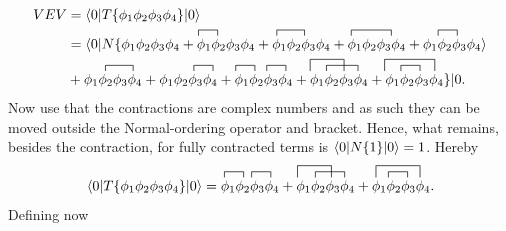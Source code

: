 \begin{example}
\begin{enumerate}
		\begin{equation}
			\begin{split}
				VEV&=\braket{0|T\{\phi_1\phi_2\phi_3\phi_4\}|0}\\
				&
				\contraction{,,,,,,,,,,,,,,,,,,,,}{\phi_1}{.}{\phi_2}
				\contraction{,,,,,,,.,,,,,,,,,,,,,,,,,,,,,,,,,}{\phi_1}{,,}{\phi_2}
				\contraction{,,,,,,,,,,,,,,,,,,,,,,.,,,,,,,,,,,,,,,,,,,,,,}{\phi_1}{,,,,}{\phi_2}
				\contraction{,,,,,,,,,,,,,,,,,,,,,,,,.,,,,,,,,,,,,,,,,,,,,,,,,,,,,,,,,,,}{\phi_1}{.}{\phi_2}
				=\braket{0|N\{\phi_1\phi_2\phi_3\phi_4+\phi_1\phi_2\phi_3\phi_4+\phi_1\phi_2\phi_3\phi_4+\phi_1\phi_2\phi_3\phi_4+\phi_1\phi_2\phi_3\phi_4}\\
					&{
					\contraction{,,,,,}{\phi_1}{,,}{\phi_2}
					\contraction{,,,,,,,,,,,.,.,,,,,,}{\phi_1}{.}{\phi_2}
					\contraction{,,,,,,,,,,,,,,,,,,,,,,,,,,}{\phi_1}{.}{\phi_2}
					\contraction{,,,,,,,,,,,,,,,,,,,,,,,,,,,,,,,}{\phi_1}{.}{\phi_2}
					\contraction[2ex]{,,,,,,,,,,,,,,,,,,,,,,,,,,,,,,,,,,,,,,}{\phi_1}{,,,}{\phi_2}
					\contraction{,,,,,,.,,,,,,,,,,,,,,,,,,,,,,,,,,,,,,,,,,}{\phi_1}{.,,}{\phi_2}
					\contraction[2ex]{,,,,,,,,,,,,,,,,,,,,,,,,,,,,,,,,,,,,,,,,,,,,,,,,,,}{\phi_1}{,,,,.,}{\phi_2}
					\contraction{,,,,,,.,,,,,,,,,,,,,,,,,,,,,,,,,,,,,,,,,,,,,,,,,,,,,,}{\phi_1}{.}{\phi_2}
					+\phi_1\phi_2\phi_3\phi_4+\phi_1\phi_2\phi_3\phi_4+\phi_1\phi_2\phi_3\phi_4+\phi_1\phi_2\phi_3\phi_4+\phi_1\phi_2\phi_3\phi_4\}|0}.\\
			\end{split}
		\end{equation} 
		Now use that the contractions are complex numbers and as such they can be moved outside the Normal-ordering operator and bracket. Hence, what remains, besides the contraction, for fully contracted terms is $\braket{0|N\{1\}|0}=1$. Hereby
		\begin{equation}
			\contraction{,,,,,,,,,,,,,.,,,,,,.,}{\phi_1}{.}{\phi_2}
			\contraction{,,,,,,,,,,,,,,.,,,,,,,,,,,}{\phi_1}{.}{\phi_2}
			\contraction[2ex]{,,,,,,,,,,,,,,,,,,,,,,,,,,,,,,,,,}{\phi_1}{,,,}{\phi_2}
			\contraction{,,,,,,.,,,,,,,,..,,,,,,,,,,,,,,,,,,,,}{\phi_1}{..,}{\phi_2}
			\contraction[2ex]{,,,,,,,,,,,,,,.,,,,,,,,,,,,,,,,,,,,,,,,,,,,,,,}{\phi_1}{,,,,.}{\phi_2}
			\contraction{,,,,,,.,,,,,,,,,,,,,,,,,,,,,,,,,,,,,,,,,,,,,,,,,}{\phi_1}{.}{\phi_2}
			\braket{0|T\{\phi_1\phi_2\phi_3\phi_4\}|0}=\phi_1\phi_2\phi_3\phi_4+\phi_1\phi_2\phi_3\phi_4+\phi_1\phi_2\phi_3\phi_4.
		\end{equation} 
		Defining now
		\begin{equation}

\end{equation}
\end{enumerate}
\end{example}
